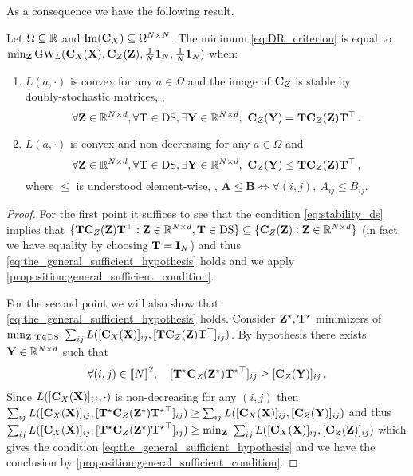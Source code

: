 As a consequence we have the following result.
\begin{proposition}
	\label{proposition:thetwoconditions}
	Let $\Omega \subseteq \mathbb{R}$ and $\operatorname{Im}({\mathbf{C}}_{X}) \subseteq \Omega^{N \times N}$. The minimum \cref{eq:DR_criterion} is equal to $\min_{{\mathbf{Z}}} \operatorname{GW}_L({\mathbf{C}}_{X}({\mathbf{X}}), {\mathbf{C}}_{Z}({\mathbf{Z}}), \frac{1}{N}\mathbf{1}_N, \frac{1}{N}\mathbf{1}_N)$ when:
	\begin{enumerate}[label=(\roman*), rightmargin=25pt]
		\item $L(a, \cdot)$ is convex for any $a \in \Omega$ and the image of ${\mathbf{C}}_{Z}$ is stable by \\
        doubly-stochastic matrices, \ie, 
		\begin{equation}
			\label{eq:stability_ds}
			\forall {\mathbf{Z}} \in \mathbb{R}^{N \times d}, \forall {\mathbf{T}} \in \operatorname{DS}, \exists {\mathbf{Y}} \in \mathbb{R}^{N \times d}, \ {\mathbf{C}}_{Z}({\mathbf{Y}}) = {\mathbf{T}} {\mathbf{C}}_{Z}({\mathbf{Z}}) {\mathbf{T}}^\top\,.
		\end{equation}
		\item $L(a, \cdot)$ is convex \underline{and non-decreasing} for any $a \in \Omega$ and
		\begin{equation}
			\label{eq:another_condition_based_on_convexity}
			\forall {\mathbf{Z}} \in \mathbb{R}^{N \times d}, \forall {\mathbf{T}} \in \operatorname{DS}, \exists {\mathbf{Y}} \in \mathbb{R}^{N \times d}, \ {\mathbf{C}}_{Z}({\mathbf{Y}}) \leq {\mathbf{T}} {\mathbf{C}}_{Z}({\mathbf{Z}}) {\mathbf{T}}^\top\,,
		\end{equation}
		where $\leq$ is understood element-wise, \ie, $\bm{A} \leq \bm{B} \iff \forall (i,j), \ A_{ij} \leq B_{ij}$. 
	\end{enumerate}
\end{proposition}
\begin{proof}
	For the first point it suffices to see that the condition \cref{eq:stability_ds} implies that $\{{\mathbf{T}} {\mathbf{C}}_{Z}({\mathbf{Z}}) {\mathbf{T}}^\top: {\mathbf{Z}} \in \mathbb{R}^{N \times d}, {\mathbf{T}} \in \operatorname{DS}\} \subseteq \{{\mathbf{C}}_{Z}({\mathbf{Z}}): {\mathbf{Z}} \in \mathbb{R}^{N \times d}\}$ (in fact we have equality by choosing ${\mathbf{T}} = \mathbf{I}_N$) and thus \cref{eq:the_general_sufficient_hypothesis} holds and we apply \cref{proposition:general_sufficient_condition}.
	
	For the second point we will also show that \cref{eq:the_general_sufficient_hypothesis} holds. Consider ${\mathbf{Z}}^\star, {\mathbf{T}}^\star$ minimizers of $\min_{\mZ, \mT \in \DS} \ \sum_{ij} L([\simiX(\mX)]_{ij}, [\mT \simi(\mZ) \mT^\top]_{ij})$. By hypothesis there exists ${\mathbf{Y}} \in \mathbb{R}^{N \times d}$ such that 
    \begin{align}
        \forall (i,j) \in {[\![N]\!]}^2, \quad [{\mathbf{T}}^\star {\mathbf{C}}_{Z}({\mathbf{Z}}^\star) {{\mathbf{T}}^{\star}}^\top]_{ij} \geq [{\mathbf{C}}_{Z}({\mathbf{Y}})]_{ij} \:.
    \end{align}
    Since $L([{\mathbf{C}}_{X}({\mathbf{X}})]_{ij}, \cdot)$ is non-decreasing for any $(i,j)$ then $\sum_{ij} L([{\mathbf{C}}_{X}({\mathbf{X}})]_{ij}, [{\mathbf{T}}^\star {\mathbf{C}}_{Z}({\mathbf{Z}}^\star) {{\mathbf{T}}^{\star}}^\top]_{ij}) \geq \sum_{ij} L([{\mathbf{C}}_{X}({\mathbf{X}})]_{ij}, [{\mathbf{C}}_{Z}({\mathbf{Y}})]_{ij})$ and thus $\sum_{ij} L([{\mathbf{C}}_{X}({\mathbf{X}})]_{ij}, [{\mathbf{T}}^\star {\mathbf{C}}_{Z}({\mathbf{Z}}^\star) {{\mathbf{T}}^{\star}}^\top]_{ij}) \geq \min_{{\mathbf{Z}}} \ \sum_{ij} L([{\mathbf{C}}_{X}({\mathbf{X}})]_{ij}, [{\mathbf{C}}_{Z}({\mathbf{Z}})]_{ij})$ which gives the condition \cref{eq:the_general_sufficient_hypothesis} and we have the conclusion by \cref{proposition:general_sufficient_condition}. 
\end{proof}

